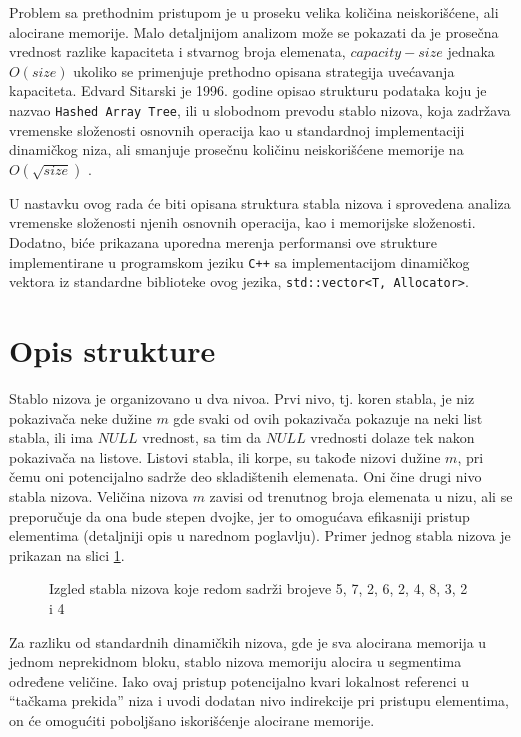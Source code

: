 \documentclass[a4paper]{article}
\begin{document}
Problem sa prethodnim pristupom je u proseku velika količina neiskorišćene, ali alocirane memorije. Malo detaljnijom analizom može se pokazati da je prosečna vrednost razlike kapaciteta i stvarnog broja elemenata, $capacity - size$ jednaka $O(size)$ ukoliko se primenjuje prethodno opisana strategija uvećavanja kapaciteta. Edvard Sitarski je 1996. godine opisao strukturu podataka koju je nazvao \verb|Hashed Array Tree|, ili u slobodnom prevodu stablo nizova, koja zadržava vremenske složenosti osnovnih operacija kao u standardnoj implementaciji dinamičkog niza, ali smanjuje prosečnu količinu neiskorišćene memorije na $O(\sqrt{size})$ \cite{hat-sitarski}.

U nastavku ovog rada će biti opisana struktura stabla nizova i sprovedena analiza vremenske složenosti njenih osnovnih operacija, kao i memorijske složenosti. Dodatno, biće prikazana uporedna merenja performansi ove strukture implementirane u programskom jeziku \verb|C++| sa implementacijom dinamičkog vektora iz standardne biblioteke ovog jezika, \verb|std::vector<T, Allocator>|.

\section{Opis strukture}

Stablo nizova je organizovano u dva nivoa. Prvi nivo, tj. koren stabla, je niz pokazivača neke dužine $m$ gde svaki od ovih pokazivača pokazuje na neki list stabla, ili ima $NULL$ vrednost, sa tim da $NULL$ vrednosti dolaze tek nakon pokazivača na listove. Listovi stabla, ili korpe, su takođe nizovi dužine $m$, pri čemu oni potencijalno sadrže deo skladištenih elemenata. Oni čine drugi nivo stabla nizova. Veličina nizova $m$ zavisi od trenutnog broja elemenata u nizu, ali se preporučuje da ona bude stepen dvojke, jer to omogućava efikasniji pristup elementima (detaljniji opis u narednom poglavlju). Primer jednog stabla nizova je prikazan na slici \ref{fig:hat-struktura-primer}.

\begin{figure}[h!]
    \centering
    
    \caption{Izgled stabla nizova koje redom sadrži brojeve 5, 7, 2, 6, 2, 4, 8, 3, 2 i 4}
    \label{fig:hat-struktura-primer}
\end{figure}

Za razliku od standardnih dinamičkih nizova, gde je sva alocirana memorija u jednom neprekidnom bloku, stablo nizova memoriju alocira u segmentima određene veličine. Iako ovaj pristup potencijalno kvari lokalnost referenci u \enquote{tačkama prekida} niza i uvodi dodatan nivo indirekcije pri pristupu elementima, on će omogućiti poboljšano iskorišćenje alocirane memorije.
\end{document}

